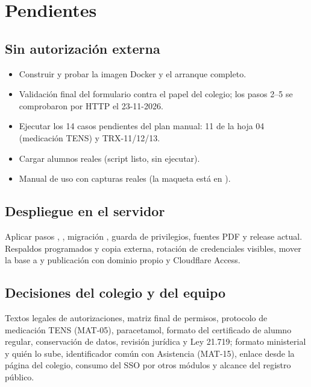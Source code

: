 \section{Pendientes}

\subsection{Sin autorización externa}

\begin{itemize}[leftmargin=*,itemsep=0.2em]
\item Construir y probar la imagen Docker y el arranque completo.
\item Validación final del formulario contra el papel del colegio; los pasos
  2--5 se comprobaron por HTTP el 23-11-2026.
\item Ejecutar los 14 casos pendientes del plan manual: 11 de la hoja 04
  (medicación TENS) y TRX-11/12/13.
\item Cargar alumnos reales (script 
  listo, sin ejecutar).
\item Manual de uso con capturas reales (la maqueta está en
  ).
\end{itemize}

\subsection{Despliegue en el servidor}

Aplicar pasos , , migración , guarda
de privilegios, fuentes PDF y release actual. Respaldos programados y copia
externa, rotación de credenciales visibles, mover la base a
 y publicación con dominio propio y Cloudflare Access.

\subsection{Decisiones del colegio y del equipo}

Textos legales de autorizaciones, matriz final de permisos, protocolo de
medicación TENS (MAT-05), paracetamol, formato del certificado de alumno
regular, conservación de datos, revisión jurídica y Ley 21.719; formato
ministerial y quién lo sube, identificador común con Asistencia (MAT-15),
enlace desde la página del colegio, consumo del SSO por otros módulos y
alcance del registro público.

